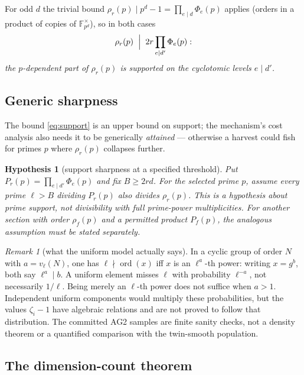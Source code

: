 \documentclass[11pt]{article}
\newtheorem{hypothesis}[theorem]{Hypothesis}
\theoremstyle{remark}
\newtheorem{remark}[theorem]{Remark}
\newcommand{\F}{\mathbb{F}}
\DeclareMathOperator{\ord}{ord}
\begin{document}
For odd $d$ the trivial bound $\rho_r(p) \mid p^d - 1 = \prod_{e\mid d}
\Phi_e(p)$ applies (orders in a product of copies of $\F_{p^d}^\times$), so
in both cases
\begin{equation}\label{eq:support}
\rho_r(p) \;\Bigm|\; 2r \prod_{e \mid d'} \Phi_e(p):
\end{equation}
\emph{the $p$-dependent part of $\rho_r(p)$ is supported on the cyclotomic
levels $e \mid d'$.}

\subsection{Generic sharpness}

The bound \eqref{eq:support} is an upper bound on support; the mechanism's
cost analysis also needs it to be generically \emph{attained} --- otherwise a
harvest could fish for primes $p$ where $\rho_r(p)$ collapses further.

\begin{hypothesis}[support sharpness at a specified threshold]
\label{prop:sharp}
Put $P_r(p)=\prod_{e\mid d'}\Phi_e(p)$ and fix $B\ge2rd$.
For the selected prime $p$, assume every prime $\ell>B$ dividing $P_r(p)$
also divides $\rho_r(p)$. This is a hypothesis about prime support, not
divisibility with full prime-power multiplicities.
For another section with order $\rho_f(p)$ and a permitted product $P_f(p)$,
the analogous assumption must be stated separately.
\end{hypothesis}

\begin{remark}[what the uniform model actually says]
In a cyclic group of order $N$ with $a=v_\ell(N)$, one has
$\ell\nmid\ord(x)$ iff $x$ is an $\ell^a$-th power: writing $x=g^b$,
both say $\ell^a\mid b$. A uniform element misses $\ell$ with probability
$\ell^{-a}$, not necessarily $1/\ell$. Being merely an $\ell$-th power
does not suffice when $a>1$. Independent uniform components would multiply
these probabilities, but the values $\zeta_i-1$ have algebraic relations
and are not proved to follow that distribution. The committed AG2 samples
are finite sanity checks, not a density theorem or a quantified comparison
with the twin-smooth population.
\end{remark}

\subsection{The dimension-count theorem}
\end{document}
